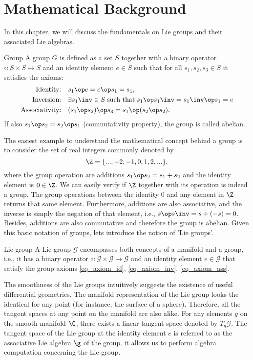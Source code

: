 \chapter{Mathematical Background}
In this chapter, we will discuss the fundamentals on Lie groups and their associated Lie algebras.

\begin{define}{Group}
A group $G$ is defined as a set $S$ together with a binary operator $\circ: {S} \times {S} \mapsto {S}$ and an identity element $e \in {S}$ such that for all $s_1,s_2,s_3 \in S$ it satisfies the axioms:
%
\begin{align}
\text{Identity:} & \quad s_1 \op e = e \op s_1 = s_1, \label{eq_axiom_id}\\
\text{Inversion:} &  \quad \exists s_1\inv \in S \;\text{such that}\; s_1 \op s_1\inv = s_1\inv \op s_1 = e \label{eq_axiom_inv} \\
\text{Associativity:} &  \quad  (s_1 \op s_2 ) \op s_3 = s_1 \op (s_2 \op s_2) \label{eq_axiom_ass}.
\end{align}
%
If also $s_1 \op s_2 = s_2 \op s_1$ (commutativity property), the group is called abelian.
\end{define}
%
The easiest example to understand the mathematical concept behind a group is to consider the set of real integers commonly denoted by 
%
\begin{equation}
\Z = \{...,-2,-1,0,1,2,... \},
\end{equation}
%
\noindent where the group operation are additions $s_1\op s_2 = s_1 + s_2$ and the identity element is $0 \in \Z$. We can easily verify if $\Z$ together with its operation is indeed a group. The group operations between the identity $0$ and any element in $\Z$ returns that same element. Furthermore, additions are also associative, and the inverse is simply the negation of that element, i.e., $s\op s\inv = s + (-s) = 0 $. Besides, additions are also commutative and therefore the group is abelian. Given this basic notation of groups, lets introduce the notion of 'Lie groups'.
\begin{define}{Lie group}
A Lie group $\mathcal{G}$ encompasses both concepts of a manifold and a group, i.e., it has a binary operator $\circ: \mathcal{G} \times \mathcal{G}\mapsto \mathcal{G}$ and an identity element $e \in \mathcal{G}$ that satisfy
the group axioms \ref{eq_axiom_id}, \ref{eq_axiom_inv}, \ref{eq_axiom_ass}.
\end{define}
%
\noindent The smoothness of the Lie groups intuitively suggests the existence of useful differential geometries. The manifold representation of the Lie group looks the identical for any point (for instance, the surface of a sphere). Therefore, all the tangent spaces at any point on the manifold are also alike.  For any elements $g$ on the smooth manifold $\G$, there exists a linear tangent space denoted by $T_{g} \mathcal{G}$. The tangent space of the Lie group at the identity element $e$ is referred to as the associative Lie algebra $\g$ of the group. it allows us to perform algebra computation concerning the Lie group.

